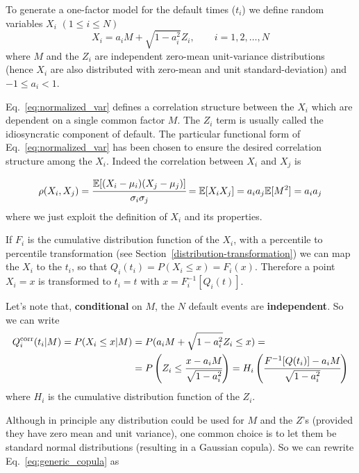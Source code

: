 To generate a one-factor model for the default times (\(t_i\)) we define random
variables \(X_i\) \((1\le i \le N)\)
\begin{equation}
X_i = a_i M + \sqrt{1-a_i^2}Z_i,\qquad i = 1, 2,\ldots, N
\label{eq:normalized_var}
\end{equation}
where \(M\) and the \(Z_i\) are independent zero-mean unit-variance  distributions (hence $X_i$ are also distributed with zero-mean and unit standard-deviation) and \(-1 \le a_i \lt 1\).

Eq.~\ref{eq:normalized_var} defines a correlation structure between the
\(X_i\) which are dependent on a single common factor \(M\). The $Z_i$ term is usually called the idiosyncratic component of default. 
The particular functional form of Eq.~\ref{eq:normalized_var} has been chosen 
to ensure the desired correlation structure among the $X_i$.
Indeed the correlation between \(X_i\) and \(X_j\) is

\begin{equation*}
\rho(X_i, X_j) = \cfrac{\mathbb{E}[(X_i-\mu_i)(X_j-\mu_j)]}{\sigma_{i}\sigma_{j}} =\mathbb{E}[X_i X_j] = a_i a_j \mathbb{E}[M^2] = a_i a_j
\end{equation*}
where we just exploit the definition of $X_i$ and its properties.

If $F_i$ is the cumulative distribution function of the $X_i$,
with a percentile to percentile transformation (see Section~\ref{distribution-transformation}) we can map the \(X_i\) to the \(t_i\), so that $Q_i(t_i) = P(X_i\le x)=F_i(x)$.
Therefore a point \(X_i = x\) is transformed to \(t_i = t\) with
\(x = F_i^{-1}[Q_i(t)]\).

Let's note that, \textbf{conditional} on $M$, the $N$ default events are \textbf{independent}. So we can write
\begin{equation}
\begin{split}
Q_i^{\textrm{corr}}(t_i|M) = P(X_i\le x|M) &= P(a_i M + \sqrt{1-a_i^2}Z_i\le x) =\\
&= P\left(Z_i\le \cfrac{x-a_i M}{\sqrt{1-a_i^2}}\right)
=H_i\left(\cfrac{F^{-1}[Q(t_i)]-a_i M}{\sqrt{1-a_i^2}}\right)
\end{split}
\label{eq:generic_copula}
\end{equation}
where $H_i$ is the cumulative distribution function of the $Z_i$.

Although in principle any distribution could be used for \(M\) and the
\(Z\)'s (provided they have zero mean and unit variance), one common
choice is to let them be standard normal distributions (resulting in a
Gaussian copula).
So we can rewrite Eq.~\ref{eq:generic_copula} as

